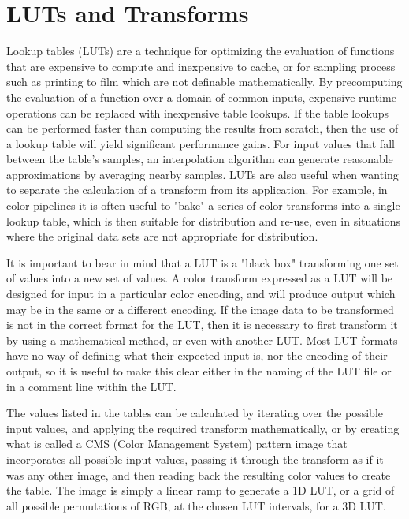 \section{LUTs and Transforms}%
\label{sec:luts-and-transforms}

Lookup tables (LUTs) are a technique for optimizing the evaluation of functions that are expensive to compute and inexpensive to cache, or for sampling process such as printing to film which are not definable mathematically. By precomputing the evaluation of a function over a domain of common inputs, expensive runtime operations can be replaced with inexpensive table lookups. If the table lookups can be performed faster than computing the results from scratch, then the use of a lookup table will yield significant performance gains. For input values that fall between the table's samples, an interpolation algorithm can generate reasonable approximations by averaging nearby samples. LUTs are also useful when wanting to separate the calculation of a transform from its application. For example, in color pipelines it is often useful to "bake" a series of color transforms into a single lookup table, which is then suitable for distribution and re-use, even in situations where the original data sets are not appropriate for distribution.

It is important to bear in mind that a LUT is a "black box" transforming one set of values into a new set of values. A color transform expressed as a LUT will be designed for input in a particular color encoding, and will produce output which may be in the same or a different encoding. If the image data to be transformed is not in the correct format for the LUT, then it is necessary to first transform it by using a mathematical method, or even with another LUT. Most LUT formats have no way of defining what their expected input is, nor the encoding of their output, so it is useful to make this clear either in the naming of the LUT file or in a comment line within the LUT.

The values listed in the tables can be calculated by iterating over the possible input values, and applying the required transform mathematically, or by creating what is called a CMS (Color Management System) pattern image that incorporates all possible input values, passing it through the transform as if it was any other image, and then reading back the resulting color values to create the table. The image is simply a linear ramp to generate a 1D LUT, or a grid of all possible permutations of RGB, at the chosen LUT intervals, for a 3D LUT.

